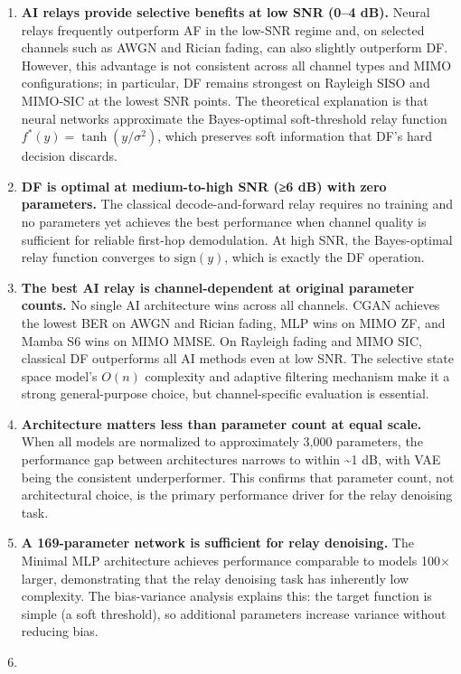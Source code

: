 \documentclass[
  english,
  12pt,
  12pt,
  a4paper,
  oneside]{report}
\begin{document}
\begin{enumerate}
\def\labelenumi{\arabic{enumi}.}
\item
  \textbf{AI relays provide selective benefits at low SNR (0--4 dB).} Neural relays frequently outperform AF in the low-SNR regime and, on selected channels such as AWGN and Rician fading, can also slightly outperform DF. However, this advantage is not consistent across all channel types and MIMO configurations; in particular, DF remains strongest on Rayleigh SISO and MIMO-SIC at the lowest SNR points. The theoretical explanation is that neural networks approximate the Bayes-optimal soft-threshold relay function \(f^*(y) = \tanh(y/\sigma^2)\), which preserves soft information that DF's hard decision discards.
\item
  \textbf{DF is optimal at medium-to-high SNR (≥6 dB) with zero parameters.} The classical decode-and-forward relay requires no training and no parameters yet achieves the best performance when channel quality is sufficient for reliable first-hop demodulation. At high SNR, the Bayes-optimal relay function converges to \(\text{sign}(y)\), which is exactly the DF operation.
\item
  \textbf{The best AI relay is channel-dependent at original parameter counts.} No single AI architecture wins across all channels. CGAN achieves the lowest BER on AWGN and Rician fading, MLP wins on MIMO ZF, and Mamba S6 wins on MIMO MMSE. On Rayleigh fading and MIMO SIC, classical DF outperforms all AI methods even at low SNR. The selective state space model's \(O(n)\) complexity and adaptive filtering mechanism make it a strong general-purpose choice, but channel-specific evaluation is essential.
\item
  \textbf{Architecture matters less than parameter count at equal scale.} When all models are normalized to approximately 3,000 parameters, the performance gap between architectures narrows to within \textasciitilde1 dB, with VAE being the consistent underperformer. This confirms that parameter count, not architectural choice, is the primary performance driver for the relay denoising task.
\item
  \textbf{A 169-parameter network is sufficient for relay denoising.} The Minimal MLP architecture achieves performance comparable to models 100× larger, demonstrating that the relay denoising task has inherently low complexity. The bias-variance analysis explains this: the target function is simple (a soft threshold), so additional parameters increase variance without reducing bias.
\item

\end{enumerate}
\end{document}
